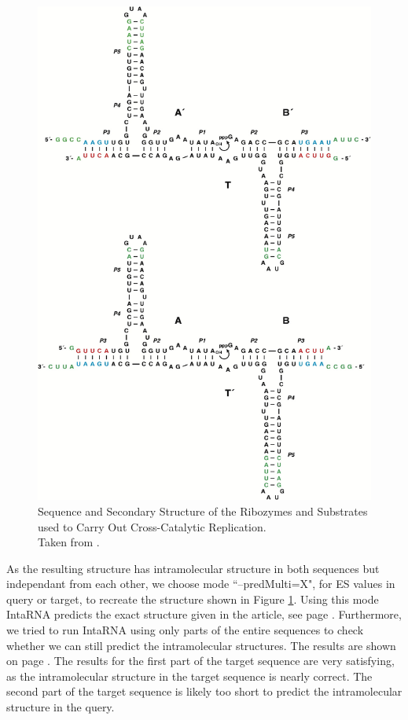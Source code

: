 \documentclass[11pt,a4paper]{report}
\begin{document}
\begin{figure}[H]
\centering
\captionsetup{justification=centering,margin=2cm}
\includegraphics[scale=0.55]{gr3_lrg.jpg}
\caption{Sequence and Secondary Structure of the Ribozymes and Substrates used to Carry Out Cross-Catalytic Replication.\\Taken from \cite{doi:10.1016/j.chembiol.2004.08.021}.}
\label{cross}
\end{figure}
\noindent
As the resulting structure has intramolecular structure in both sequences but independant from each other, we choose mode ``--predMulti=X", for ES values in query or target, to recreate the structure shown in Figure \ref{cross}. Using this mode IntaRNA predicts the exact structure given in the article, see page \pageref{Result:cross}. Furthermore, we tried to run IntaRNA using only parts of the entire sequences to check whether we can still predict the intramolecular structures. The results are shown on page \pageref{Result:split}. The results for the first part of the target sequence are very satisfying, as the intramolecular structure in the target sequence is nearly correct. The second part of the target sequence is likely too short to predict the intramolecular structure in the query.\\
\end{document}
